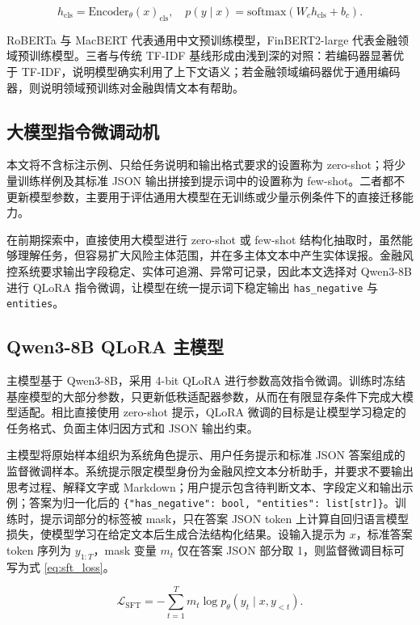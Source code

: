 \documentclass[UTF8,a4paper,12pt]{ctexart}
\begin{document}
\begin{equation}
h_{\mathrm{cls}}=\mathrm{Encoder}_{\theta}(x)_{\mathrm{cls}},\quad
p(y\mid x)=\mathrm{softmax}(W_ch_{\mathrm{cls}}+b_c).
\label{eq:encoder_classifier}
\end{equation}

RoBERTa 与 MacBERT 代表通用中文预训练模型，FinBERT2-large 代表金融领域预训练模型。三者与传统 TF-IDF 基线形成由浅到深的对照：若编码器显著优于 TF-IDF，说明模型确实利用了上下文语义；若金融领域编码器优于通用编码器，则说明领域预训练对金融舆情文本有帮助。

\subsection{大模型指令微调动机}

本文将不含标注示例、只给任务说明和输出格式要求的设置称为 zero-shot；将少量训练样例及其标准 JSON 输出拼接到提示词中的设置称为 few-shot。二者都不更新模型参数，主要用于评估通用大模型在无训练或少量示例条件下的直接迁移能力。

在前期探索中，直接使用大模型进行 zero-shot 或 few-shot 结构化抽取时，虽然能够理解任务，但容易扩大风险主体范围，并在多主体文本中产生实体误报。金融风控系统要求输出字段稳定、实体可追溯、异常可记录，因此本文选择对 Qwen3-8B 进行 QLoRA 指令微调，让模型在统一提示词下稳定输出 \texttt{has\_negative} 与 \texttt{entities}。

\subsection{Qwen3-8B QLoRA 主模型}

主模型基于 Qwen3-8B，采用 4-bit QLoRA 进行参数高效指令微调。训练时冻结基座模型的大部分参数，只更新低秩适配器参数，从而在有限显存条件下完成大模型适配。相比直接使用 zero-shot 提示，QLoRA 微调的目标是让模型学习稳定的任务格式、负面主体归因方式和 JSON 输出约束。

主模型将原始样本组织为系统角色提示、用户任务提示和标准 JSON 答案组成的监督微调样本。系统提示限定模型身份为金融风控文本分析助手，并要求不要输出思考过程、解释文字或 Markdown；用户提示包含待判断文本、字段定义和输出示例；答案为归一化后的 \texttt{\{"has\_negative": bool, "entities": list[str]\}}。训练时，提示词部分的标签被 mask，只在答案 JSON token 上计算自回归语言模型损失，使模型学习在给定文本后生成合法结构化结果。设输入提示为 $x$，标准答案 token 序列为 $y_{1:T}$，mask 变量 $m_t$ 仅在答案 JSON 部分取 1，则监督微调目标可写为式 \ref{eq:sft_loss}。

\begin{equation}
\mathcal{L}_{\mathrm{SFT}}
=-\sum_{t=1}^{T} m_t \log p_{\theta}(y_t \mid x,y_{<t}).
\label{eq:sft_loss}
\end{equation}
\end{document}
